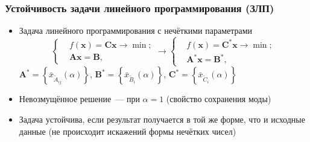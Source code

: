 \documentclass[12pt]{beamer}
\begin{document}
\begin{frame}
  \frametitle{Устойчивость задачи линейного программирования (ЗЛП)}
  \begin{itemize}
    \item Задача линейного программирования с нечёткими параметрами
    \begin{equation}
      \label{eq:fuzzy-lp-unstable-problem}
      \left\{ \begin{aligned}
        & f\left( \mathbf{x} \right)=\mathbf{Cx}\to \min;  \\ 
        & \mathbf{Ax}=\mathbf{B},
      \end{aligned} \right.
      \to
      \left\{ \begin{aligned}
        & f\left( \mathbf{x} \right)={\mathbf{C}^{*}}\mathbf{x}\to \min;  \\ 
        & {\mathbf{A}^{*}}\mathbf{x}={\mathbf{B}}^{*},
      \end{aligned} \right.
    \end{equation}
    $\mathbf{A}^{*}=\left\{ \bar{x}_{\tilde{A}_{ij}}\left(\alpha \right) \right\}$, $\mathbf{B}^{*}=\left\{ \bar{x}_{\tilde{B}_i}\left(\alpha \right) \right\}$, $\mathbf{C}^{*}=\left\{ \bar{x}_{\tilde{C}_i}\left(\alpha \right) \right\}$
    \item Невозмущённое решение~--- при $\alpha=1$ (свойство сохранения моды)
    \item Задача устойчива, если результат получается в той же форме, что и исходные данные (не происходит искажений формы нечётких чисел)
  \end{itemize}
\end{frame}

\end{document}
